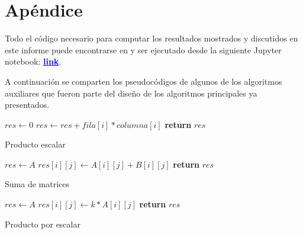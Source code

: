 \section*{Apéndice}

Todo el código necesario para computar los resultados mostrados y discutidos en este informe puede encontrarse en y ser ejecutado desde la siguiente Jupyter notebook: \href{https://colab.research.google.com/drive/1AtO3fGa4pEk_aWhHOXmj6WMH6FihLcvY?usp=sharing}{\textbf{\textcolor{blue}{link}}}.

A continuación se comparten los pseudocódigos de algunos de los algoritmos auxiliares que fueron parte del diseño de los algoritmos principales ya presentados.

\begin{algorithm}[H]
\begin{algorithmic}[1]
    \State $res \gets 0$
        \State $res \gets res + fila[i]*columna[i]$
    \EndFor
    \State \textbf{return} $res$
\EndFunction
\end{algorithmic}
\caption{Producto escalar}
\label{alg:producto_escalar}
\end{algorithm}

\begin{algorithm}[H]
\begin{algorithmic}[1]
    \State $res \gets A$ 
            \State $res[i][j] \gets A[i][j] + B[i][j]$
        \EndFor
    \EndFor
    \State \textbf{return} $res$
\EndFunction
\end{algorithmic}
\caption{Suma de matrices}
\label{alg:suma_matricial}
\end{algorithm}

\begin{algorithm}[H]
\begin{algorithmic}[1]
    \State $res \gets A$ 
            \State $res[i][j] \gets k*A[i][j]$
        \EndFor
    \EndFor
    \State \textbf{return} $res$
\EndFunction
\end{algorithmic}
\caption{Producto por escalar}
\label{alg:producto_por_escalar}
\end{algorithm}